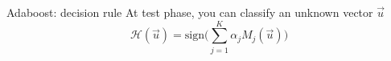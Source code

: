 \begin{frame}{Adaboost: decision rule}
At test phase, you can classify an unknown vector $\vec{u}$ 
\begin{equation*}
\mathcal{H}(\vec{u})=\text{sign}\Big(\sum_{j=1}^K \alpha_j M_j(\vec{u})\Big)
\end{equation*}
\end{frame}
